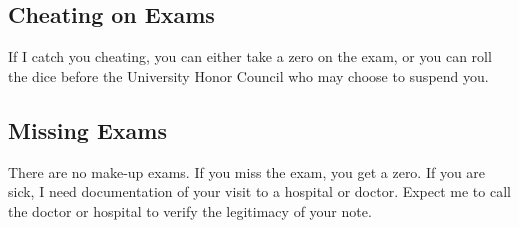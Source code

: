 \subsection*{Cheating on Exams}

If I catch you cheating, you can either take a zero on the exam, or you can roll the dice before the University Honor Council who may choose to suspend you. 


\subsection*{Missing Exams}

There are no make-up exams. If you miss the exam, you get a zero. If you are sick, I need documentation of your visit to a hospital or doctor. Expect me to call the doctor or hospital to verify the legitimacy of your note. %

